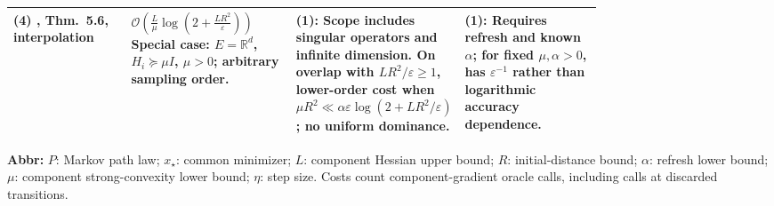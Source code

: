 \begin{table}[tp]
\begin{threeparttable}
\begin{tabularx}{\linewidth}{@{}>{\raggedright\arraybackslash}p{0.20\linewidth}>{\raggedright\arraybackslash}p{0.29\linewidth}>{\raggedright\arraybackslash}p{0.28\linewidth}>{\raggedright\arraybackslash}X@{}}
\midrule
\textbf{(4)} \citep{mqEven2023}, Thm.~5.6, interpolation & $\mathcal{O}\!\left(\frac{L}{\mu}\log\left(2+\frac{LR^2}{\varepsilon}\right)\right)$\newline Special case: $E=\mathbb R^d$, $H_i\succeq\mu I$, $\mu>0$; arbitrary sampling order. & \textbf{(1)}: Scope includes singular operators and infinite dimension. On overlap with $LR^2/\varepsilon\ge1$, lower-order cost when $\mu R^2\ll\alpha\varepsilon\log(2+LR^2/\varepsilon)$; no uniform dominance. & \textbf{(1)}: Requires refresh and known $\alpha$; for fixed $\mu,\alpha>0$, has $\varepsilon^{-1}$ rather than logarithmic accuracy dependence. \\
\bottomrule
\end{tabularx}
\begin{tablenotes}[flushleft]\footnotesize
\item[] \textbf{Abbr:} $P$: Markov path law; $x_\star$: common minimizer; $L$: component Hessian upper bound; $R$: initial-distance bound; $\alpha$: refresh lower bound; $\mu$: component strong-convexity lower bound; $\eta$: step size. Costs count component-gradient oracle calls, including calls at discarded transitions.
\end{tablenotes}
\end{threeparttable}
\end{table}
\clearpage
